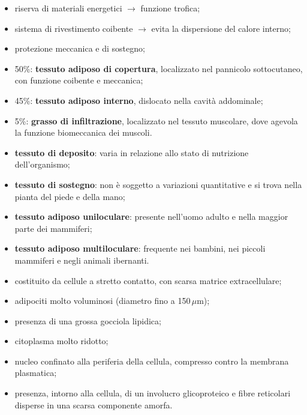 \begin{itemize}
  \item riserva di materiali energetici $\rightarrow$ funzione trofica;
  \item sistema di rivestimento coibente $\rightarrow$ evita la dispersione del calore interno;
  \item protezione meccanica e di sostegno;
  \item 50\%: \textbf{tessuto adiposo di copertura}, localizzato nel pannicolo sottocutaneo, con funzione coibente e meccanica;
  \item 45\%: \textbf{tessuto adiposo interno}, dislocato nella cavità addominale;
  \item 5\%: \textbf{grasso di infiltrazione}, localizzato nel tessuto muscolare, dove agevola la funzione biomeccanica dei muscoli.
\end{itemize}

\begin{itemize}
  \item \textbf{tessuto di deposito}: varia in relazione allo stato di nutrizione dell'organismo;
  \item \textbf{tessuto di sostegno}: non è soggetto a variazioni quantitative e si trova nella pianta del piede e della mano;
  \item \textbf{tessuto adiposo uniloculare}: presente nell'uomo adulto e nella maggior parte dei mammiferi;
  \item \textbf{tessuto adiposo multiloculare}: frequente nei bambini, nei piccoli mammiferi e negli animali ibernanti.
\end{itemize}

\begin{itemize}
  \item costituito da cellule a stretto contatto, con scarsa matrice extracellulare;
  \item adipociti molto voluminosi (diametro fino a 150\,$\mu$m);
  \item presenza di una grossa gocciola lipidica;
  \item citoplasma molto ridotto;
  \item nucleo confinato alla periferia della cellula, compresso contro la membrana plasmatica;
  \item presenza, intorno alla cellula, di un involucro glicoproteico e fibre reticolari disperse in una scarsa componente amorfa.
\end{itemize}

